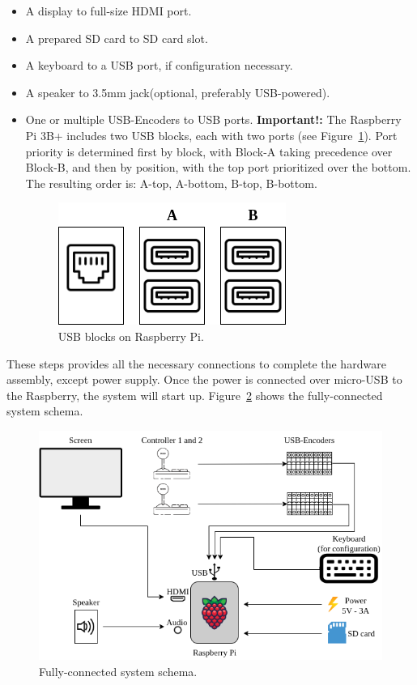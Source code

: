 \begin{itemize}
  \item A display to full-size HDMI port.
  \item A prepared SD card to SD card slot.
  \item A keyboard to a USB port, if configuration necessary.
  \item A speaker to 3.5mm jack(optional, preferably USB-powered).
  \item One or multiple USB-Encoders to USB ports.
    \newline\textbf{Important!:} The Raspberry Pi 3B+ includes two USB blocks, each with two ports (see Figure~\ref{fig:usb_ports}). Port priority is determined first by block, with Block-A taking precedence over Block-B, and then by position, with the top port prioritized over the bottom. The resulting order is: A-top, A-bottom, B-top, B-bottom.

    \newpage

    \begin{figure}[htb]
      \centering
      \includegraphics[scale=0.85]{F_Figures/usb_ports.png}
      \caption{USB blocks on Raspberry Pi.}
      \label{fig:usb_ports}
    \end{figure}

\end{itemize}

These steps provides all the necessary connections to complete the hardware assembly, except power supply. Once the power is connected over micro-USB to the Raspberry, the system will start up.
Figure~\ref{fig:system_schema} shows the fully-connected system schema.
\\
\begin{figure}[htb]
  \centering
  \includegraphics[scale=0.58]{F_Figures/system_schema.png}
  \caption{Fully-connected system schema.}
  \label{fig:system_schema}
\end{figure}


